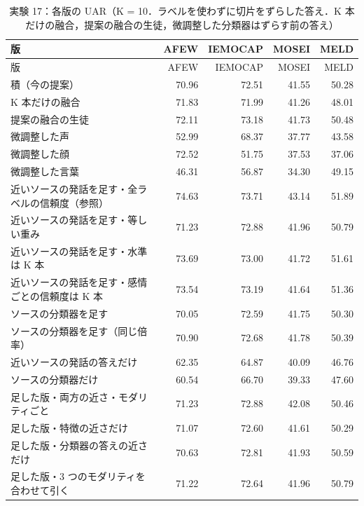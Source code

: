 \begin{longtable}{>{\raggedright}p{8.2cm}rrrr}
\caption{実験 17：各版の UAR（K = 10．ラベルを使わずに切片をずらした答え．K 本だけの融合，提案の融合の生徒，微調整した分類器はずらす前の答え）}\\
\toprule
版 & AFEW & IEMOCAP & MOSEI & MELD \\
\midrule
\endfirsthead
\toprule
版 & AFEW & IEMOCAP & MOSEI & MELD \\
\midrule
\endhead
\bottomrule
\endfoot

積（今の提案） & 70.96 & 72.51 & 41.55 & 50.28 \\
K 本だけの融合 & 71.83 & 71.99 & 41.26 & 48.01 \\
提案の融合の生徒 & 72.11 & 73.18 & 41.73 & 50.48 \\
微調整した声 & 52.99 & 68.37 & 37.77 & 43.58 \\
微調整した顔 & 72.52 & 51.75 & 37.53 & 37.06 \\
微調整した言葉 & 46.31 & 56.87 & 34.30 & 49.15 \\
近いソースの発話を足す・全ラベルの信頼度（参照） & 74.63 & 73.71 & 43.14 & 51.89 \\
近いソースの発話を足す・等しい重み & 71.23 & 72.88 & 41.96 & 50.79 \\
近いソースの発話を足す・水準は K 本 & 73.69 & 73.00 & 41.72 & 51.61 \\
近いソースの発話を足す・感情ごとの信頼度は K 本 & 73.54 & 73.19 & 41.64 & 51.36 \\
ソースの分類器を足す & 70.05 & 72.59 & 41.75 & 50.30 \\
ソースの分類器を足す（同じ倍率） & 70.90 & 72.68 & 41.78 & 50.39 \\
近いソースの発話の答えだけ & 62.35 & 64.87 & 40.09 & 46.76 \\
ソースの分類器だけ & 60.54 & 66.70 & 39.33 & 47.60 \\
足した版・両方の近さ・モダリティごと & 71.23 & 72.88 & 42.08 & 50.46 \\
足した版・特徴の近さだけ & 71.07 & 72.60 & 41.61 & 50.29 \\
足した版・分類器の答えの近さだけ & 70.63 & 72.81 & 41.93 & 50.59 \\
足した版・3 つのモダリティを合わせて引く & 71.22 & 72.64 & 41.96 & 50.79 \\
\end{longtable}
